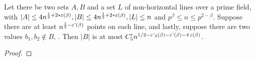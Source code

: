\begin{theorem}
    \label{ST_grid_final}
    \leanok
    Let there be two sets $A, B$ and a set $L$ of non-horizontal lines over a prime field, 
    with $|A| \leq 4n^{\frac12 + 2*\operatorname{\varepsilon}(\beta)}, |B| \leq 4n^{\frac12 + 2*\operatorname{\varepsilon}(\beta)}, |L| \leq n$ and $p^\beta \leq n \leq p^{2 - \beta}$.
    Suppose there are at least $n^{\frac12 - \operatorname{\varepsilon'}(\beta)}$ points on each line, and lastly,
    suppose there are two values $b_1, b_2 \notin B$, .
    Then $|B|$ is at most $C'_5 n^{1/2 - \operatorname{\varepsilon'_2}(\beta) - \operatorname{\varepsilon'}(\beta) - 4 \operatorname{\varepsilon}(\beta)}$.
\end{theorem}

\begin{proof}
    \leanok
\end{proof}